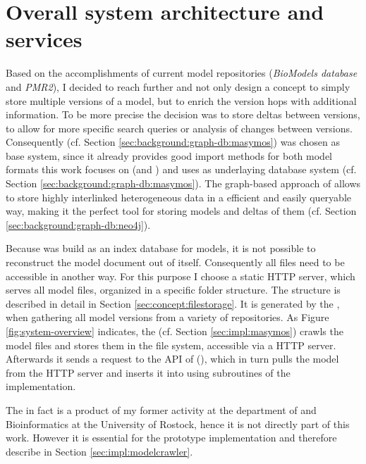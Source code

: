 \label{sec:concept}

\section{Overall system architecture and services}
\label{sec:concept:sysarchitecture}

Based on the accomplishments of current model repositories (\emph{BioModels database} and \emph{PMR2}), I decided to reach further and not only design a concept to simply store multiple versions of a model, but to enrich the version hops with additional information. To be more precise the decision was to store deltas between versions, to allow for more specific search queries or analysis of changes between versions.
Consequently \masymos (cf. Section \ref{sec:background:graph-db:masymos}) was chosen as base system, since it already provides good import methods for both model formats this work focuses on (\sbml and \cellml) and uses \neoj as underlaying database system (cf. Section \ref{sec:background:graph-db:masymos}). The graph-based approach of \neoj allows to store highly interlinked heterogeneous data in a efficient and easily queryable way, making it the perfect tool for storing models and deltas of them (cf. Section \ref{sec:background:graph-db:neo4j}).  

Because \masymos was build as an index database for models, it is not possible to reconstruct the \xml model document out of \masymos itself. Consequently all files need to be accessible in another way. For this purpose I choose a static HTTP server, which serves all model files, organized in a specific folder structure. The structure is described in detail in Section \ref{sec:concept:filestorage}.
It is generated by the \modelcrawler, when gathering all model versions from a variety of repositories. As Figure \ref{fig:system-overview} indicates, the \modelcrawler (cf. Section \ref{sec:impl:masymos}) crawls the model files and stores them in the file system, accessible via a HTTP server. Afterwards it sends a request to the \rest API of \masymos (\morre), which in turn pulls the model from the HTTP server and inserts it into \neoj using subroutines of the \masymos implementation.

The \modelcrawler in fact is a product of my former activity at the department of \sysbio and Bioinformatics at the University of Rostock, hence it is not directly part of this work. However it is essential for the prototype implementation and therefore describe in Section \ref{sec:impl:modelcrawler}.

